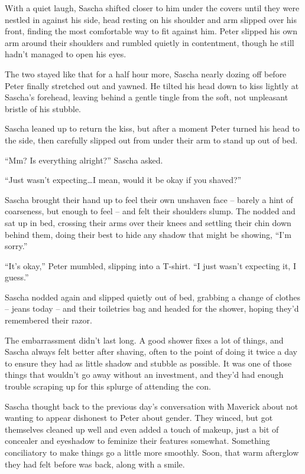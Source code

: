 With a quiet laugh, Sascha shifted closer to him under the covers until they were nestled in against his side, head resting on his shoulder and arm slipped over his front, finding the most comfortable way to fit against him. Peter slipped his own arm around their shoulders and rumbled quietly in contentment, though he still hadn't managed to open his eyes.

The two stayed like that for a half hour more, Sascha nearly dozing off before Peter finally stretched out and yawned. He tilted his head down to kiss lightly at Sascha's forehead, leaving behind a gentle tingle from the soft, not unpleasant bristle of his stubble.

Sascha leaned up to return the kiss, but after a moment Peter turned his head to the side, then carefully slipped out from under their arm to stand up out of bed.

``Mm? Is everything alright?'' Sascha asked.

``Just wasn't expecting\ldots{}I mean, would it be okay if you shaved?''

Sascha brought their hand up to feel their own unshaven face -- barely a hint of coarseness, but enough to feel -- and felt their shoulders slump. The nodded and sat up in bed, crossing their arms over their knees and settling their chin down behind them, doing their best to hide any shadow that might be showing, ``I'm sorry.''

``It's okay,'' Peter mumbled, slipping into a T-shirt. ``I just wasn't expecting it, I guess.''

Sascha nodded again and slipped quietly out of bed, grabbing a change of clothes -- jeans today -- and their toiletries bag and headed for the shower, hoping they'd remembered their razor.

\secdiv

The embarrassment didn't last long. A good shower fixes a lot of things, and Sascha always felt better after shaving, often to the point of doing it twice a day to ensure they had as little shadow and stubble as possible. It was one of those things that wouldn't go away without an investment, and they'd had enough trouble scraping up for this splurge of attending the con.

Sascha thought back to the previous day's conversation with Maverick about not wanting to appear dishonest to Peter about gender. They winced, but got themselves cleaned up well and even added a touch of makeup, just a bit of concealer and eyeshadow to feminize their features somewhat. Something conciliatory to make things go a little more smoothly. Soon, that warm afterglow they had felt before was back, along with a smile.

